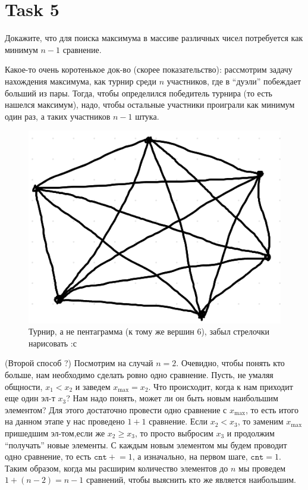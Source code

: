 \section{Task 5}
\begin{task}
    Докажите, что для поиска максимума в массиве различных чисел потребуется как минимум $n - 1$ сравнение.
\end{task}

\begin{solution}
    Какое-то очень коротенькое док-во (скорее показательство): рассмотрим задачу нахождения максимума, как турнир среди $n$ участников, где в ``дуэли'' побеждает больший из пары. Тогда, чтобы определился победитель турнира (то есть нашелся максимум), надо, чтобы остальные участники проиграли как минимум один раз, а таких участников $n-1$ штука.
    \begin{figure}[H]
        \centering
        \includegraphics[scale=0.3]{pics/5.png}
        \caption{Турнир, а не пентаграмма (к тому же вершин 6), забыл стрелочки нарисовать :с}
    \end{figure}
\end{solution}

\begin{solution}
    (Второй способ ?) Посмотрим на случай $n = 2$. Очевидно, чтобы понять кто больше, нам необходимо сделать ровно одно сравнение. Пусть, не умаляя общности, $x_1 < x_2$ и заведем $x_{\text{max}} = x_2$. Что происходит, когда к нам приходит еще один эл-т $x_3$? Нам надо понять, может ли он быть новым наибольшим элементом? Для этого достаточно провести одно сравнение с $x_{\text{max}}$, то есть итого на данном этапе у нас проведено $1+1$ сравнение. Если $x_2 < x_3$, то заменим $x_{\text{max}}$ пришедшим эл-том,если же $x_2 \geq x_3$, то просто выбросим $x_3$ и продолжим ``получать'' новые элементы. С каждым новым элементом мы будем проводит одно сравнение, то есть $\texttt{cnt} +\!\!= 1$, а изначально, на первом шаге, $\texttt{cnt} = 1$. Таким образом, когда мы расширим количество элементов до $n$ мы проведем $1 + (n-2) = n-1$ сравнений, чтобы выяснить кто же является наибольшим.
\end{solution}